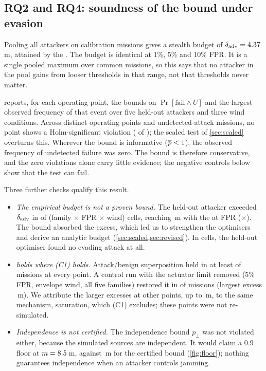 \subsection{RQ2 and RQ4: soundness of the bound under evasion}
Pooling all attackers on calibration missions gives a stealth budget of
$\delta_{\mathrm{adv}}=4.37$\,m, attained by the \nDadvArgFive. The budget is identical at
1\%, 5\% and 10\% FPR. It is a single pooled maximum over common missions, so this
says that no attacker in the pool gains from looser thresholds in that range,
not that thresholds never matter.

 reports, for each operating point, the bounds on
$\Pr[\text{fail}\wedge U]$ and the largest observed frequency of that event over
five held-out attackers and three wind conditions. Across \nSoundPoints{}
distinct operating points and \nUndetectedTotal{} undetected-attack missions,
no point shows a Holm-significant violation (\nSoundViol{} of
\nSoundPoints); the scaled test of \cref{sec:scaled} overturns
this. Wherever the bound is informative ($\overline{p}<1$), the observed frequency of
undetected failure was zero. The bound is therefore conservative, and the zero
violations alone carry little evidence; the negative controls below show that
the test can fail.

Three further checks qualify this result.
\begin{itemize}
\item \emph{The empirical budget is not a proven bound.} The held-out attacker
  exceeded $\delta_{\mathrm{adv}}$ in \nSupExceed{} of \nSupChecks{} (family $\times$ FPR $\times$
  wind) cells, reaching \nHeldoutAdvMax\,m with the \nHeldoutAdvFam{} at
  \nHeldoutAdvFpr{} FPR (\nHeldoutAdvRatio$\times$). The bound absorbed the
  excess, which led us to strengthen the optimisers and derive an analytic
  budget (\cref{sec:scaled,sec:revised}). In \nZeroUndet{} cells, the
  held-out optimiser found no evading attack at all.
\item \emph{ holds where (C1) holds.} Attack/benign
  superposition held in at least \nSuperposMin{} of missions at every point. A
  control run with the actuator limit removed (5\% FPR, envelope wind, all five
  families) restored it in \nSatUnsatMin{} of missions (largest excess
  \nSatUnsatExcess\,m). We attribute the larger excesses at other points, up to
  \nSuperposExcessMax\,m, to the same mechanism, saturation, which (C1)
  excludes; these points were not re-simulated.
\item \emph{Independence is not certified.} The independence bound
  $p_\perp$ was not violated either, because the simulated sources are
  independent. It would claim a 0.9 floor at $m=8.5$\,m, against
  \nMNinety\,m for the certified bound (\cref{fig:floor}); nothing guarantees
  independence when an attacker controls jamming.
\end{itemize}

